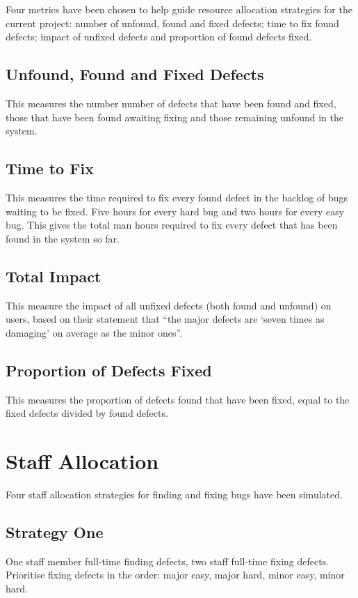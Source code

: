 \documentclass[12pt,a4paper]{article}
\begin{document}
		Four metrics have been chosen to help guide resource allocation strategies for the current project: number of unfound, found and fixed defects; time to fix found defects; impact of unfixed defects and proportion of found defects fixed.
	
	\subsection{Unfound, Found and Fixed Defects}
		This measures the number number of defects that have been found and fixed, those that have been found awaiting fixing and those remaining unfound in the system.
	
	
	\subsection{Time to Fix}
		This measures the time required to fix every found defect in the backlog of bugs waiting to be fixed. Five hours for every hard bug and two hours for every easy bug. This gives the total man hours required to fix every defect that has been found in the system so far.
	
	
	\subsection{Total Impact}
		This measure the impact of all unfixed defects (both found and unfound) on users, based on their statement that ``the major defects are `seven times as damaging' on average as the minor ones''.
	
	
	\subsection{Proportion of Defects Fixed}
		This measures the proportion of defects found that have been fixed, equal to the fixed defects divided by found defects.
	
	
	
	\section{Staff Allocation}
	
	
		Four staff allocation strategies for finding and fixing bugs have been simulated.
	
	
	\subsection{Strategy One}
		One staff member full-time finding defects, two staff full-time fixing defects. Prioritise fixing defects in the order: major easy, major hard, minor easy, minor hard.
	
\end{document}
